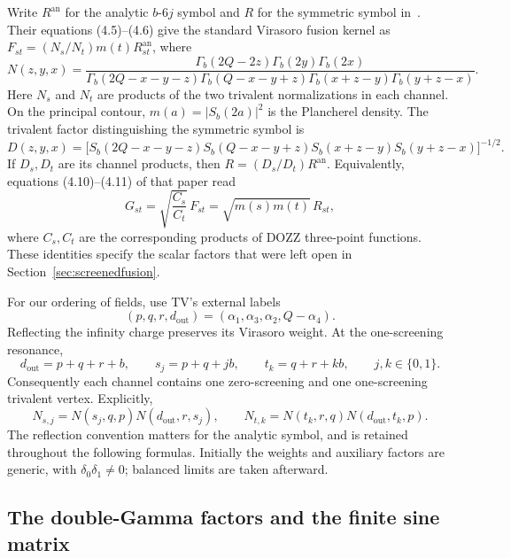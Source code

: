 Write $R^{\mathrm{an}}$ for the analytic $b$-$6j$ symbol and
$R$ for the symmetric symbol in~\cite{TeschnerVartanov}.
Their equations (4.5)--(4.6) give the standard Virasoro fusion
kernel as $F_{st}=(N_s/N_t)m(t)R^{\mathrm{an}}_{st}$, where
\begin{equation}
 N(z,y,x)=
 \frac{\Gamma_b(2Q-2z)\Gamma_b(2y)\Gamma_b(2x)}
 {\Gamma_b(2Q-x-y-z)\Gamma_b(Q-x-y+z)
  \Gamma_b(x+z-y)\Gamma_b(y+z-x)}.
 \label{eq:TVnormalization}
\end{equation}
Here $N_s$ and $N_t$ are products of the two trivalent
normalizations in each channel. On the principal contour,
$m(a)=|S_b(2a)|^2$ is the Plancherel density. The trivalent
factor distinguishing the symmetric symbol is
\[
 D(z,y,x)=
 \bigl[S_b(2Q-x-y-z)S_b(Q-x-y+z)
 S_b(x+z-y)S_b(y+z-x)\bigr]^{-1/2}.
\]
If $D_s,D_t$ are its channel products, then
$R=(D_s/D_t)R^{\mathrm{an}}$. Equivalently, equations
(4.10)--(4.11) of that paper read
\begin{equation}
 G_{st}=\sqrt{\frac{C_s}{C_t}}\,F_{st}
       =\sqrt{m(s)m(t)}\,R_{st},
 \label{eq:TVunitarykernel}
\end{equation}
where $C_s,C_t$ are the corresponding products of DOZZ
three-point functions. These identities specify the scalar
factors that were left open in Section~\ref{sec:screenedfusion}.

For our ordering of fields, use TV's external labels
\begin{equation}
 (p,q,r,d_{\mathrm{out}})
   =(\alpha_1,\alpha_3,\alpha_2,Q-\alpha_4).
 \label{eq:TVreflectedlabels}
\end{equation}
Reflecting the infinity charge preserves its Virasoro weight.
At the one-screening resonance,
\[
 d_{\mathrm{out}}=p+q+r+b,\qquad
 s_j=p+q+jb,\qquad t_k=q+r+kb,\qquad j,k\in\{0,1\}.
\]
Consequently each channel contains one zero-screening and one
one-screening trivalent vertex. Explicitly,
\[
 N_{s,j}=N(s_j,q,p)N(d_{\mathrm{out}},r,s_j),\qquad
 N_{t,k}=N(t_k,r,q)N(d_{\mathrm{out}},t_k,p).
\]
The reflection convention matters for the analytic symbol,
and is retained throughout the following formulas. Initially
the weights and auxiliary factors are generic, with
$\delta_0\delta_1\ne0$; balanced limits are taken afterward.

\subsection{The double-Gamma factors and the finite sine matrix}


